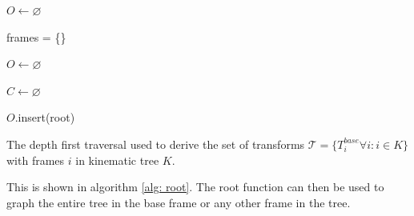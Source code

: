 \begin{algorithm}
		$O \gets \varnothing$


	frames = \{\}

	$O \gets \varnothing$

	$C \gets \varnothing$

	$O$.insert(root)




	\caption{The depth first traversal used to derive the set of transforms $\mathcal{T} =\{ T^{base}_i \forall i : i \in K\}$ with frames $i$ in kinematic tree $K$.}
	\label{alg: root}
\end{algorithm}

This is shown in algorithm \ref{alg: root}. 
The root function can then be used to graph the entire tree in the base frame or any other frame in the tree. 